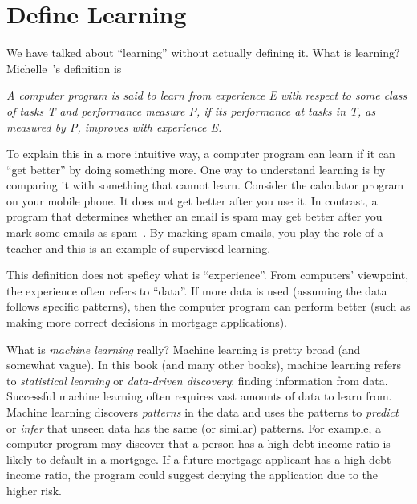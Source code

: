 \begin{comment}
http://incompleteideas.net/book/bookdraft2017nov5.pdf
Reinforcement Learning: An Introduction
Richard S. Sutton and Andrew G. Barto
\end{comment}




\section{Define Learning}

  We have talked about ``learning'' without actually defining it.
  What is learning? Michelle~\cite{Mitchell1997MachineLearning}'s
  definition is

  
  
  {\it
    A computer program is said to learn from experience E with respect
    to some class of tasks T and performance measure P, if its
    performance at tasks in T, as measured by P, improves with
    experience E.}

  

  To explain this in a more intuitive way, a computer program can
  learn if it can ``get better'' by doing something more.  One way to
  understand learning is by comparing it with something that cannot
  learn. Consider the calculator program on your mobile phone. It does
  not get better after you use it.  In contrast, a program that
  determines whether an email is spam may get better after you mark
  some emails as spam~\cite{Hastie2009ElementsStatisticalLearning}.
  By marking spam emails, you play the role of a teacher and this is
  an example of supervised learning.




This definition does not speficy what is ``experience''.  From
computers' viewpoint, the experience often refers to ``data''.  If
more data is used (assuming the data follows specific patterns), then
the computer program can perform better (such as making more correct
decisions in mortgage applications).

What is {\it machine learning} really?  Machine learning is pretty
broad (and somewhat vague).  In this book (and many other books),
machine learning refers to {\it statistical learning} or {\it
  data-driven discovery}: finding information from data.  Successful
machine learning often requires vast amounts of data to learn from.
Machine learning discovers {\it patterns} in the data and uses the
patterns to {\it predict} or {\it infer} that unseen data has the same
(or similar) patterns.  For example, a computer program may discover
that a person has a high debt-income ratio is likely to default in a
mortgage.  If a future mortgage applicant has a high debt-income
ratio, the program could suggest denying the application due to the
higher risk.

